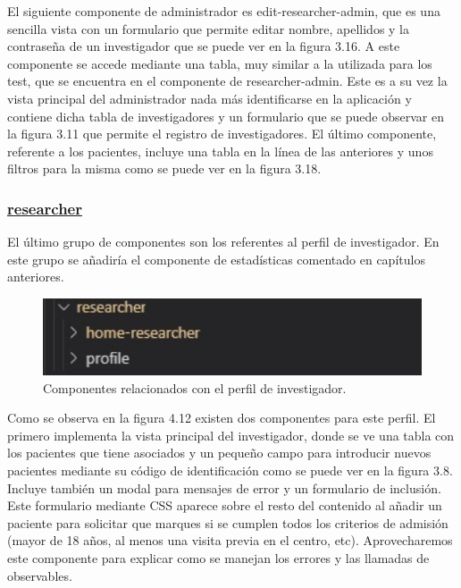     El siguiente componente de administrador es edit-researcher-admin, que es una sencilla vista con un formulario que permite editar nombre, apellidos y la contraseña de un investigador que se puede ver en la figura 3.16. A este componente se accede mediante una tabla, muy similar a la utilizada para los test, que se encuentra en el componente de researcher-admin. Este es a su vez la vista principal del administrador nada más identificarse en la aplicación y contiene dicha tabla de investigadores y un formulario que se puede observar en la figura 3.11 que permite el registro de investigadores. El último componente, referente a los pacientes, incluye una tabla en la  línea de las anteriores y unos filtros para la misma como se puede ver en la figura 3.18.\newpage
    
    \subsubsection{\underline{researcher}}
    
    El último grupo de componentes son los referentes al perfil de investigador. En este grupo se añadiría el componente de estadísticas comentado en capítulos anteriores.
    
    \begin{figure}[h]
    \centering
    \includegraphics[width=1\textwidth]{images/researcherComponent.jpg}
    \caption{Componentes relacionados con el perfil de investigador.}
    \end{figure}
    \FloatBarrier
    
    Como se observa en la figura 4.12 existen dos componentes para este perfil. El primero implementa la vista principal del investigador, donde se ve una tabla con los pacientes que tiene asociados y un pequeño campo para introducir nuevos pacientes mediante su código de identificación como se puede ver en la figura 3.8. Incluye también un modal para mensajes de error y un formulario de inclusión. Este formulario mediante CSS aparece sobre el resto del contenido al añadir un paciente para solicitar que marques si se cumplen todos los criterios de admisión (mayor de 18 años, al menos una visita previa en el centro, etc). Aprovecharemos este componente para explicar como se manejan los errores y las llamadas de observables.
    
